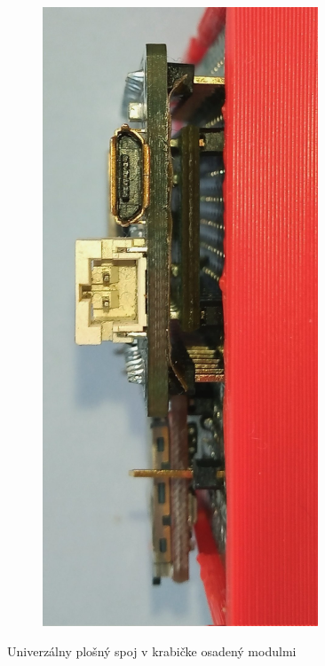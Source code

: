 \begin{figure}[h]
\begin{subfigure}[b]{0.2\textwidth}
    \includegraphics[width=0.9\textwidth]{figures/design/esp32-front.jpg}
\end{subfigure}
\caption{Univerzálny plošný spoj v krabičke osadený modulmi}
\label{board}
\end{figure}


